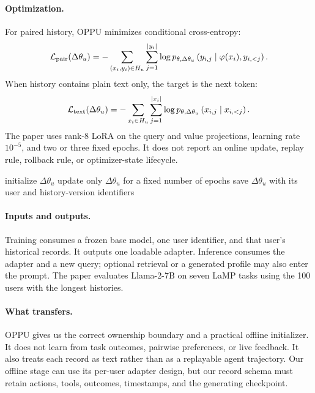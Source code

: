 \paragraph{Optimization.}
For paired history, OPPU minimizes conditional cross-entropy:
\begin{equation}
  \mathcal{L}_{\mathrm{pair}}(\Delta\theta_u)
  =
  -\sum_{(x_i,y_i)\in H_u}
   \sum_{j=1}^{|y_i|}
   \log p_{\theta,\Delta\theta_u}
   \left(y_{i,j}\mid \varphi(x_i),y_{i,<j}\right).
  \label{eq:oppu-paired}
\end{equation}
When history contains plain text only, the target is the next token:
\begin{equation}
  \mathcal{L}_{\mathrm{text}}(\Delta\theta_u)
  =
  -\sum_{x_i\in H_u}
   \sum_{j=1}^{|x_i|}
   \log p_{\theta,\Delta\theta_u}
   \left(x_{i,j}\mid x_{i,<j}\right).
  \label{eq:oppu-text}
\end{equation}
The paper uses rank-8 LoRA on the query and value projections, learning rate
$10^{-5}$, and two or three fixed epochs.  It does not report an online
update, replay rule, rollback rule, or optimizer-state lifecycle.

\begin{algorithm}[t]
  \caption{OPPU for one user}
  \label{alg:oppu-one-user}
  initialize $\Delta\theta_u$\;
  update only $\Delta\theta_u$ for a fixed number of epochs\;
  save $\Delta\theta_u$ with its user and history-version identifiers\;
\end{algorithm}

\paragraph{Inputs and outputs.}
Training consumes a frozen base model, one user identifier, and that user's
historical records.  It outputs one loadable adapter.  Inference consumes the
adapter and a new query; optional retrieval or a generated profile may also
enter the prompt.  The paper evaluates Llama-2-7B on seven LaMP tasks using
the 100 users with the longest histories.

\paragraph{What transfers.}
OPPU gives us the correct ownership boundary and a practical offline
initializer.  It does not learn from task outcomes, pairwise preferences, or
live feedback.  It also treats each record as text rather than as a replayable
agent trajectory.  Our offline stage can use its per-user adapter design, but
our record schema must retain actions, tools, outcomes, timestamps, and the
generating checkpoint.

